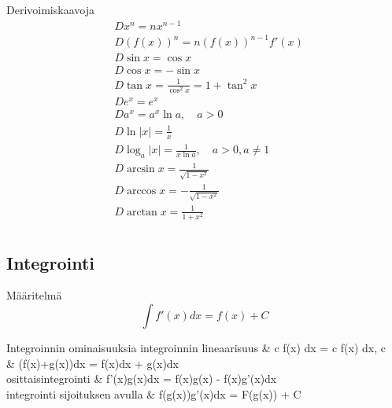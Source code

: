 Derivoimiskaavoja \cite[s. 41]{MAOL}
\begin{align*}
& Dx^n	= nx^{n-1} \\
& D(f(x))^n	= n(f(x))^{n-1} f'(x) \\
& D \sin x	= \cos x \\
& D \cos x	= -\sin x \\
& D \tan x	= \frac{1}{\cos^2 x} = 1 + \tan^2 x \\
& D e^x		= e^x \\
& D a^x		= a^x \ln a, \quad a>0 \\
& D \ln |x|	= \frac{1}{x} \\
& D \log_a |x|	= \frac{1}{x \ln a}, \quad a>0, a \neq 1 \\
& D \arcsin x	= \frac{1}{\sqrt{1-x^2}} \\
& D \arccos x	= - \frac{1}{\sqrt{1-x^2}} \\
& D \arctan x	= \frac{1}{1+x^2} \\
\end{align*}

\subsection{Integrointi}
Määritelmä \cite[(1.8)]{MAT-01360}
\begin{equation*}
\int f'(x) dx = f(x) + C
\end{equation*}

\begin{eqtable-full}{Integroinnin ominaisuuksia \cite{MAT-01360} }
integroinnin lineaarisuus 		& \int c f(x) dx = c \int f(x) dx, \quad c \in {} \\ %
														& \int (f(x)+g(x))dx = \int f(x)dx + \int g(x)dx \\
osittaisintegrointi 			& \int f'(x)g(x)dx = f(x)g(x) - \int f(x)g'(x)dx \\ %
integrointi sijoituksen avulla 	& \int f(g(x))g'(x)dx = F(g(x)) + C \\ %
\end{eqtable-full}

